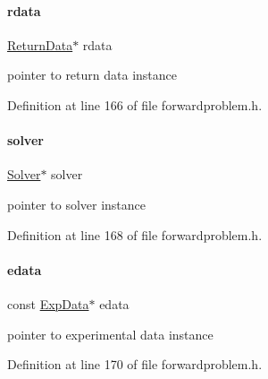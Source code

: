 \paragraph{\texorpdfstring{rdata}{rdata}}
{\footnotesize\ttfamily \mbox{\hyperlink{classamici_1_1_return_data}{Return\+Data}}$\ast$ rdata}

pointer to return data instance 

Definition at line 166 of file forwardproblem.\+h.

\mbox{\label{classamici_1_1_forward_problem_ae1ad25a4dd6b076c27672dc94d11dad0}} 
\paragraph{\texorpdfstring{solver}{solver}}
{\footnotesize\ttfamily \mbox{\hyperlink{classamici_1_1_solver}{Solver}}$\ast$ solver}

pointer to solver instance 

Definition at line 168 of file forwardproblem.\+h.

\mbox{\label{classamici_1_1_forward_problem_a9ec6aee8cd7c91d0e49aed6e3d0db4ce}} 
\paragraph{\texorpdfstring{edata}{edata}}
{\footnotesize\ttfamily const \mbox{\hyperlink{classamici_1_1_exp_data}{Exp\+Data}}$\ast$ edata}

pointer to experimental data instance 

Definition at line 170 of file forwardproblem.\+h.

